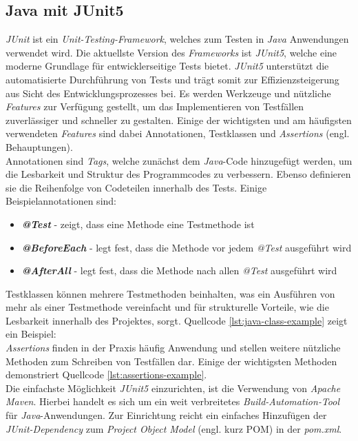 \subsection{Java mit JUnit5}
\textit{JUnit} ist ein \textit{Unit-Testing-Framework}, welches zum Testen in \textit{Java} Anwendungen verwendet wird. Die aktuellste Version des \textit{Frameworks} ist \textit{JUnit5}, welche eine moderne Grundlage für entwicklerseitige Tests bietet. \cite*{JUnit} \textit{JUnit5} unterstützt die automatisierte Durchführung von Tests und trägt somit zur Effizienzsteigerung aus Sicht des Entwicklungsprozesses bei. \cite*{venkatesanJunitFrameworkUnit} Es werden Werkzeuge und nützliche \textit{Features} zur Verfügung gestellt, um das Implementieren von Testfällen zuverlässiger und schneller zu gestalten. Einige der wichtigsten und am häufigsten verwendeten \textit{Features} sind dabei Annotationen, Testklassen und \textit{Assertions} (engl. Behauptungen). \cite*{venkatesanJunitFrameworkUnit}\\
Annotationen sind \textit{Tags}, welche zunächst dem \textit{Java}-Code hinzugefügt werden, um die Lesbarkeit und Struktur des Programmcodes zu verbessern. Ebenso definieren sie die Reihenfolge von Codeteilen innerhalb des Tests. Einige Beispielannotationen sind: \cite*{JUnitUserGuide}
\begin{itemize}
    \setlength{\parskip}{1pt}
    \item \textbf{\textit{@Test}} - zeigt, dass eine Methode eine Testmethode ist
    \item \textbf{\textit{@BeforeEach}} - legt fest, dass die Methode vor jedem \textit{@Test} ausgeführt wird
    \item \textbf{\textit{@AfterAll}} - legt fest, dass die Methode nach allen \textit{@Test} ausgeführt wird
\end{itemize}
Testklassen können mehrere Testmethoden beinhalten, was ein Ausführen von mehr als einer Testmethode vereinfacht und für strukturelle Vorteile, wie die Lesbarkeit innerhalb des Projektes, sorgt. Quellcode \ref{lst:java-class-example} zeigt ein Beispiel:\\
\vspace{-.3cm}
\textit{Assertions} finden in der Praxis häufig Anwendung und stellen weitere nützliche Methoden zum Schreiben von Testfällen dar. Einige der wichtigsten Methoden demonstriert Quellcode \ref{lst:assertions-example}.\\
\vspace{-.3cm}
Die einfachste Möglichkeit \textit{JUnit5} einzurichten, ist die Verwendung von \textit{Apache Maven}. Hierbei handelt es sich um ein weit verbreitetes \textit{Build-Automation-Tool} für \textit{Java}-Anwendungen. Zur Einrichtung reicht ein einfaches Hinzufügen der \textit{JUnit-Dependency} zum \textit{Project Object Model} (engl. kurz POM) in der \textit{pom.xml}. \cite*{baeldungGuideJUnitBaeldung2016}

